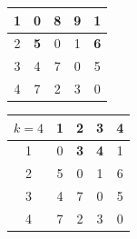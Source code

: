 \documentclass{article}
\begin{document}
\begin{enumerate}
\begin{tabular}{|c|c|c|c|c|}
    \hline
    1 & 0 & 8 & 9 & 1 \\
    \hline
    2 & \textbf{5} & 0 & 1 & \textbf{6} \\
    \hline
    3 & 4 & 7 & 0 & 5 \\
    \hline
    4 & 7 & 2 & 3 & 0 \\
    \hline
    \end{tabular}\vspace{4mm}\newline
    \begin{tabular}{|c|c|c|c|c|}
    \hline
    $k=4$ & 1 & 2 & 3 & 4 \\
    \hline
    1 & 0 & \textbf{3} & \textbf{4} & 1 \\
    \hline
    2 & 5 & 0 & 1 & 6 \\
    \hline
    3 & 4 & 7 & 0 & 5 \\
    \hline
    4 & 7 & 2 & 3 & 0 \\
    \hline
    \end{tabular}
\end{enumerate}
\end{document}
